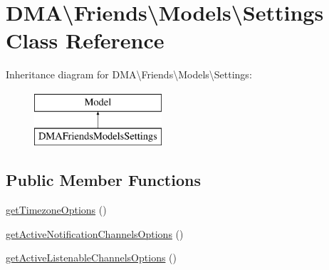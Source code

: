 \hypertarget{classDMA_1_1Friends_1_1Models_1_1Settings}{\section{D\+M\+A\textbackslash{}Friends\textbackslash{}Models\textbackslash{}Settings Class Reference}
\label{classDMA_1_1Friends_1_1Models_1_1Settings}
}
Inheritance diagram for D\+M\+A\textbackslash{}Friends\textbackslash{}Models\textbackslash{}Settings\+:\begin{figure}[H]
\begin{center}
\leavevmode
\includegraphics[height=2.000000cm]{d1/d8a/classDMA_1_1Friends_1_1Models_1_1Settings}
\end{center}
\end{figure}
\subsection*{Public Member Functions}
\begin{DoxyCompactItemize}
\item 
\hyperlink{classDMA_1_1Friends_1_1Models_1_1Settings_a347eae65e8aeb114767d5e4fc8542fea}{get\+Timezone\+Options} ()
\item 
\hyperlink{classDMA_1_1Friends_1_1Models_1_1Settings_a8c2bad0fb18f5e501d3318eba7379609}{get\+Active\+Notification\+Channels\+Options} ()
\item 
\hyperlink{classDMA_1_1Friends_1_1Models_1_1Settings_a140721a33440c666426139d6317bd357}{get\+Active\+Listenable\+Channels\+Options} ()
\end{DoxyCompactItemize}
